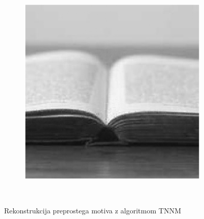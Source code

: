 \begin{figure}
\begin{subfigure}{0.325\linewidth}
    \end{subfigure}
    \hfill
    \begin{subfigure}{0.325\linewidth}
        \includegraphics[width=\linewidth]{Poglavja/Slike/preprosta grayscale 300/rez60TNNM.png}
    \end{subfigure}\\[-1cm]
    \caption{Rekonstrukcija preprostega motiva z algoritmom TNNM}
    \vspace{0.5cm}
\end{figure}

